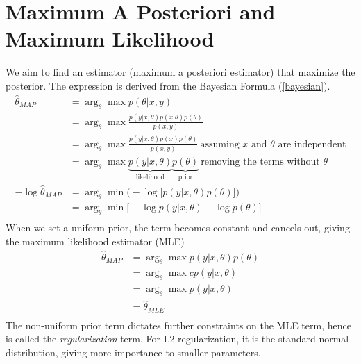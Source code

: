 \documentclass{book}
\numberwithin{equation}{subsection}
\begin{document}
\section{Maximum A Posteriori and Maximum Likelihood}
We aim to find an estimator (maximum a posteriori estimator) that maximize the posterior. The expression is derived from the Bayesian Formula (\ref{bayesian}).
\begin{align}
    \hat{\theta}_{MAP} &= \arg_\theta\max p(\theta | x,y)\\
    &= \arg_\theta\max\frac{p(y|x,\theta)p(x|\theta)p(\theta)}{p(x,y)}\\
    &= \arg_\theta\max\frac{p(y|x,\theta)p(x)p(\theta)}{p(x,y)}\ \text{assuming $x$ and $\theta$ are independent}\\
    &= \arg_\theta\max \underbrace{p(y|x,\theta)}_{\text{likelihood}}\underbrace{p(\theta)}_{\text{prior}}\ \text{removing the terms without $\theta$}\\
    -\log\hat{\theta}_{MAP} &= \arg_\theta\min \Big(-\log \big[p(y|x,\theta)p(\theta)\big]\Big)\\
    &= \arg_\theta\min \big[-\log p(y|x,\theta)-\log p(\theta)\big]\\
\end{align}
When we set a uniform prior, the term becomes constant and cancels out, giving the maximum likelihood estimator (MLE)
\begin{align}
    \hat{\theta}_{MAP} &= \arg_\theta\max p(y|x,\theta)p(\theta)\\
    &= \arg_\theta\max c p(y|x,\theta)\\
    &= \arg_\theta\max p(y|x,\theta)\\
    &= \hat{\theta}_{MLE}\\
\end{align}
The non-uniform prior term dictates further constraints on the MLE term, hence is called the \textit{regularization} term. For L2-regularization, it is the standard normal distribution, giving more importance to smaller parameters.
\end{document}

